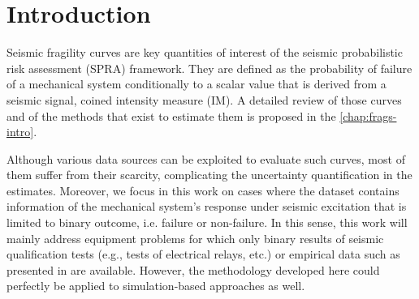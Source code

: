 \minitoc

\section{Introduction}


Seismic fragility curves are key quantities of interest of the seismic probabilistic risk assessment (SPRA) framework.
They are defined as the probability of failure of a mechanical system conditionally to a scalar value that is derived from a seismic signal, coined intensity measure (IM).
A detailed review of those curves and of the methods that exist to estimate them is proposed in the \cref{chap:frags-intro}.

Although various data sources can be exploited to evaluate such curves, most of them  suffer from their scarcity,
complicating the uncertainty quantification in the estimates.
Moreover, we focus in this work on cases where the dataset contains information of the mechanical system's response under seismic excitation that is limited to binary outcome, i.e. failure or non-failure.
In this sense, this work will mainly address equipment problems for which only binary results of seismic qualification tests (e.g., tests of electrical relays, etc.) or empirical data such as presented in \cite{straub_improved_2008} are available. However, the methodology developed here could perfectly be applied to simulation-based approaches as well.




